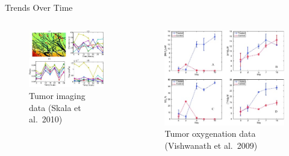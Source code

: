 \documentclass[
  ignorenonframetext,
]{beamer}
\begin{document}
\begin{frame}{Trends Over Time}
\protect\hypertarget{trends-over-time}{}
\begin{columns}[T]
\begin{column}{0.5\textwidth}
\begin{figure}

{\centering \includegraphics[width=1\textwidth,height=\textheight]{img/Skala.jpg}

}

\caption{Tumor imaging data (Skala et al.~2010)}

\end{figure}
\end{column}

\begin{column}{0.5\textwidth}
\begin{figure}

{\centering \includegraphics[width=1\textwidth,height=\textheight]{img/Vishwanath.jpg}

}

\caption{Tumor oxygenation data (Vishwanath et al.~2009)}

\end{figure}
\end{column}
\end{columns}
\end{frame}
\end{document}
